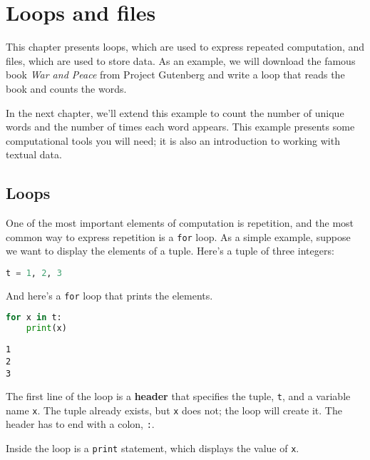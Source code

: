 \hypertarget{loops-and-files}{%
\chapter{Loops and files}\label{loops-and-files}}

This chapter presents loops, which are used to express repeated
computation, and files, which are used to store data. As an example, we
will download the famous book \emph{War and Peace} from Project
Gutenberg and write a loop that reads the book and counts the words.

In the next chapter, we'll extend this example to count the number of
unique words and the number of times each word appears. This example
presents some computational tools you will need; it is also an
introduction to working with textual data.

\hypertarget{loops}{%
\section{Loops}\label{loops}}

One of the most important elements of computation is repetition, and the
most common way to express repetition is a \passthrough{\lstinline!for!}
loop. As a simple example, suppose we want to display the elements of a
tuple. Here's a tuple of three integers:

\begin{lstlisting}[language=Python]
t = 1, 2, 3
\end{lstlisting}

And here's a \passthrough{\lstinline!for!} loop that prints the
elements.

\begin{lstlisting}[language=Python]
for x in t:
    print(x)
\end{lstlisting}

\begin{lstlisting}[]
1
2
3
\end{lstlisting}

The first line of the loop is a \textbf{header} that specifies the
tuple, \passthrough{\lstinline!t!}, and a variable name
\passthrough{\lstinline!x!}. The tuple already exists, but
\passthrough{\lstinline!x!} does not; the loop will create it. The
header has to end with a colon, \passthrough{\lstinline!:!}.

Inside the loop is a \passthrough{\lstinline!print!} statement, which
displays the value of \passthrough{\lstinline!x!}.

